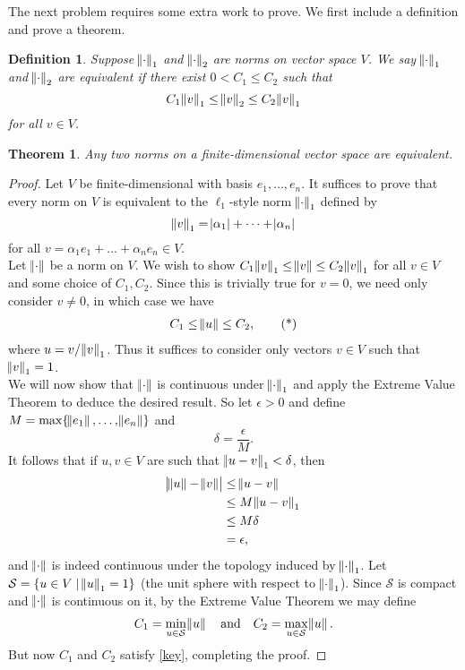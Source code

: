 \documentclass{extarticle}
\newtheorem*{thm-non}{Theorem}
\newtheorem*{definition}{Definition}
\begin{document}
The next problem requires some extra work to prove.  We first include a definition and prove a theorem.
\begin{definition}
Suppose $\norm{\cdot}_1$ and $\norm{\cdot}_2$ are norms on vector space $V$.  We say $\norm{\cdot}_1$ and $\norm{\cdot}_2$ are \emph{equivalent} if there exist $0 < C_1\leq C_2$ such that 
\begin{equation*}
C_1 \norm{v}_1 \leq \norm{v}_2 \leq C_2 \norm{v}_1
\end{equation*}
for all $v\in V$.
\end{definition}
\begin{thm-non}
Any two norms on a finite-dimensional vector space are equivalent.
\end{thm-non}
\begin{proof}
Let $V$ be finite-dimensional with basis $e_1,\dots, e_n$.  It suffices to prove that every norm on $V$ is equivalent to the $\ell_1$-style norm $\norm{\cdot}_1$ defined by
\begin{equation*}
\norm{v}_1 = \abs{\alpha_1} + \dots + \abs{\alpha_n}
\end{equation*}
for all $v = \alpha_1e_1 + \dots + \alpha_ne_n\in V$.\\
\indent Let $\norm{\cdot}$ be a norm on $V$.  We wish to show $C_1\norm{v}_1 \leq \norm{v}\leq C_2\norm{v}_1$ for all $v\in V$ and some choice of $C_1,C_2$.  Since this is trivially true for $v = 0$, we need only consider $v\neq 0$, in which case we have
\begin{align*}
C_1 \leq \norm{u} \leq C_2, \tag{*}\label{key}
\end{align*}
where $u = v/\norm{v}_1$.  Thus it suffices to consider only vectors $v\in V$ such that $\norm{v}_1 = 1$.\\
\indent We will now show that $\norm{\cdot}$ is continuous under $\norm{\cdot}_1$ and apply the Extreme Value Theorem to deduce the desired result.  So let $\epsilon > 0$ and define $M = \max\{\norm{e_1}, \dots, \norm{e_n}\}$ and
\begin{equation*}
\delta = \frac{\epsilon}{M}.
\end{equation*}
It follows that if $u,v\in V$ are such that $\norm{u - v}_1 < \delta$, then
\begin{align*}
\abs{\norm{u} - \norm{v}} &\leq \norm{u - v}\\
&\leq M\norm{u - v}_1\\
&\leq M\delta \\
&= \epsilon,
\end{align*}
and $\norm{\cdot}$ is indeed continuous under the topology induced by $\norm{\cdot}_1$.  Let $\mathcal{S} = \{u\in V\mid \norm{u}_1=1\}$ (the unit sphere with respect to $\norm{\cdot}_1$).  Since $\mathcal{S}$ is compact and $\norm{\cdot}$ is continuous on it, by the Extreme Value Theorem we may define
\begin{align*}
C_1 = \min_{u \in \mathcal{S}}\norm{u}~~~\text{and}~~~C_2 =  \max_{u \in \mathcal{S}}\norm{u}.
\end{align*}
But now $C_1$ and $C_2$ satisfy \eqref{key}, completing the proof.
\end{proof}
\end{document}

